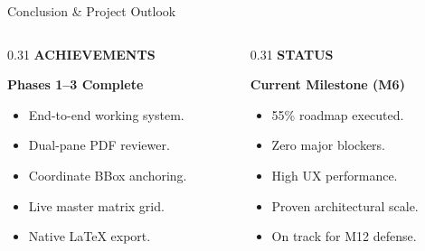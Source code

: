 \documentclass[aspectratio=169,10pt]{beamer}
\begin{document}
\begin{frame}{Conclusion \& Project Outlook}
\vspace{-0.15cm}
\begin{columns}[T]
  \begin{column}{0.31\textwidth}
    {\fontsize{8.5pt}{10.5pt}\selectfont\bfseries\color{SubText} ACHIEVEMENTS}\par\vspace{3pt}
    {\fontsize{12pt}{14.5pt}\selectfont\bfseries\color{DarkText} Phases 1--3 Complete}\par\vspace{6pt}
    {\fontsize{9pt}{12pt}\selectfont\color{DarkText}
    \begin{itemize}\setlength{\itemsep}{4pt}
      \item End-to-end working system.
      \item Dual-pane PDF reviewer.
      \item Coordinate BBox anchoring.
      \item Live master matrix grid.
      \item Native LaTeX export.
    \end{itemize}}
  \end{column}

  \begin{column}{0.31\textwidth}
    {\fontsize{8.5pt}{10.5pt}\selectfont\bfseries\color{SubText} STATUS}\par\vspace{3pt}
    {\fontsize{12pt}{14.5pt}\selectfont\bfseries\color{DarkText} Current Milestone (M6)}\par\vspace{6pt}
    {\fontsize{9pt}{12pt}\selectfont\color{DarkText}
    \begin{itemize}\setlength{\itemsep}{4pt}
      \item 55\% roadmap executed.
      \item Zero major blockers.
      \item High UX performance.
      \item Proven architectural scale.
      \item On track for M12 defense.
    \end{itemize}}
  \end{column}


\end{columns}
\end{frame}
\end{document}
